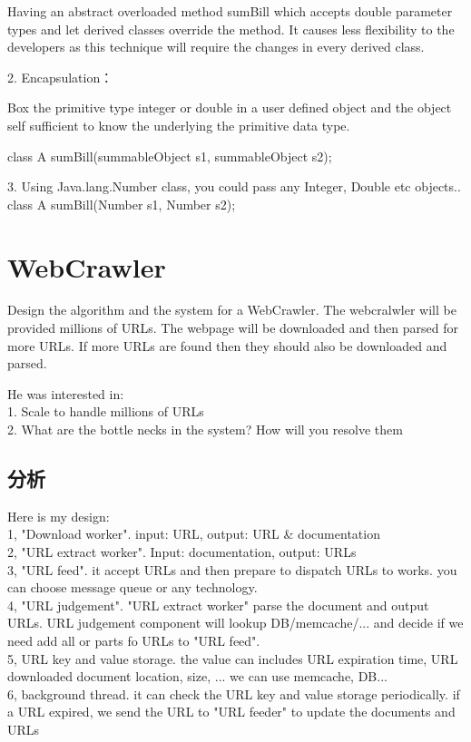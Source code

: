 Having an abstract overloaded method sumBill which accepts double parameter types and let derived classes override the method. It causes less flexibility to the developers as this
technique will require the changes in every derived class.

2. Encapsulation：

Box the primitive type integer or double in a user defined object and the object self sufficient to know the underlying the primitive data type.

class A{
	sumBill(summableObject s1, summableObject s2);
}

3. Using Java.lang.Number class, you could pass any Integer, Double etc objects..
class A{
	sumBill(Number s1, Number s2);
}

\section{WebCrawler}
Design the algorithm and the system for a WebCrawler.
The webcralwler will be provided millions of URLs. The webpage will be downloaded and then parsed for more URLs. If more URLs are found then they should also be downloaded and
parsed.

He was interested in: \\
1. Scale to handle millions of URLs \\
2. What are the bottle necks in the system? How will you resolve them

\subsection{分析}
Here is my design: \\
1, "Download worker". input: URL, output: URL \& documentation \\
2, "URL extract worker". Input: documentation, output: URLs \\
3, "URL feed". it accept URLs and then prepare to dispatch URLs to works. you can choose message queue or any technology. \\
4, "URL judgement". "URL extract worker" parse the document and output URLs. URL judgement component will lookup DB/memcache/... and decide if we need add all or parts fo URLs to
"URL feed". \\
5, URL key and value storage. the value can includes URL expiration time, URL downloaded document location, size, ... we can use memcache, DB... \\
6, background thread. it can check the URL key and value storage periodically. if a URL expired, we send the URL to "URL feeder" to update the documents and URLs

